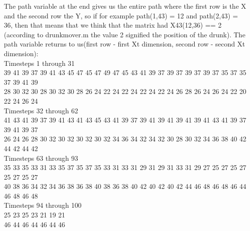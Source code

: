The path variable at the end gives us the entire path where the first row is the X and the second row the Y, so if for example path(1,43) = 12 and path(2,43) = 36, then that means that we think that the matrix had X{43}(12,36) == 2 (according to drunkmover.m the value 2 signified the position of the drunk). The path variable returns to us(first row - first X{t} dimension, second row - second X{t} dimension):\\

Timesteps 1 through 31\\
39    41    39    37    39    41    43    45    47    45    47    49    47    45    43    41    39    37    39    37    39    37    39    37    35    37    35    37    39    41    39\\
28    30    32    30    28    30    32    30    28    26    24    22    24    22    24    22    24    22    24    26    28    26    24    26    24    22    20    22    24    26    24\\

Timesteps 32 through 62\\
41    43    41    39    37    39    41    43    41    43    45    43    41    39    37    39    41    39    41    39    41    39    41    43    41    39    37    39    41    39    37\\
26    24    26    28    30    32    30    32    30    32    30    32    34    36    34    32    34    32    30    28    30    32    34    36    38    40    42    44    42    44    42\\

Timesteps 63 through 93\\
35    33    35    33    31    33    35    37    35    37    35    33    31    33    31    29    31    29    31    33    31    29    27    25    27    25    27    25    27    25    27\\
40    38    36    34    32    34    36    38    36    38    40    38    36    38    40    42    40    42    40    42    44    46    48    46    48    46    44    46    48    46    48\\

Timesteps 94 through 100\\
25    23    25    23    21    19    21\\
46    44    46    44    46    44    46\\